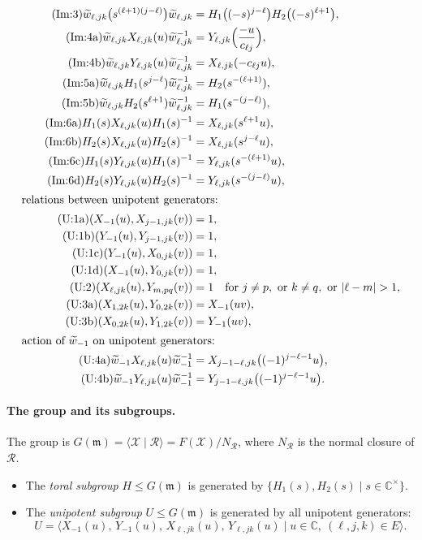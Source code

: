 \documentclass[11pt]{article}
\theoremstyle{definition}
\theoremstyle{remark}
\newcommand{\tw}{\widetilde{w}}
\newcommand{\Cx}{\mathbb{C}^{\times}}
\begin{document}
\begin{align*}
\tag{Im:3} \tw_{\ell,jk}\big(s^{(\ell+1)(j-\ell)}\big)\tw_{\ell,jk}&=H_1\big((-s)^{j-\ell}\big)H_2\big((-s)^{\ell+1}\big),\\
\tag{Im:4a} \tw_{\ell,jk}X_{\ell,jk}(u)\tw_{\ell,jk}^{-1}&=Y_{\ell,jk}\Big(\frac{-u}{c_{\ell j}}\Big),\\
\tag{Im:4b} \tw_{\ell,jk}Y_{\ell,jk}(u)\tw_{\ell,jk}^{-1}&=X_{\ell,jk}(-c_{\ell j}u),\\
\tag{Im:5a} \tw_{\ell,jk}H_1(s^{j-\ell})\tw_{\ell,jk}^{-1}&=H_2(s^{-(\ell+1)}),\\
\tag{Im:5b} \tw_{\ell,jk}H_2(s^{\ell+1})\tw_{\ell,jk}^{-1}&=H_1(s^{-(j-\ell)}),\\
\tag{Im:6a} H_1(s)X_{\ell,jk}(u)H_1(s)^{-1}&=X_{\ell,jk}(s^{\ell+1}u),\\
\tag{Im:6b} H_2(s)X_{\ell,jk}(u)H_2(s)^{-1}&=X_{\ell,jk}(s^{j-\ell}u),\\
\tag{Im:6c} H_1(s)Y_{\ell,jk}(u)H_1(s)^{-1}&=Y_{\ell,jk}(s^{-(\ell+1)}u),\\
\tag{Im:6d} H_2(s)Y_{\ell,jk}(u)H_2(s)^{-1}&=Y_{\ell,jk}(s^{-(j-\ell)}u),\\
\intertext{relations between unipotent generators:}
\tag{U:1a} (X_{-1}(u),X_{j-1,jk}(v))&=1,\\
\tag{U:1b} (Y_{-1}(u),Y_{j-1,jk}(v))&=1,\\
\tag{U:1c} (Y_{-1}(u),X_{0,jk}(v))&=1,\\
\tag{U:1d} (X_{-1}(u),Y_{0,jk}(v))&=1,\\
\tag{U:2} (X_{\ell,jk}(u),Y_{m,pq}(v))&=1\quad\text{for } j\neq p,\text{ or }k\neq q,\text{ or }|\ell-m|>1,\\
\tag{U:3a} (X_{1,2k}(u),Y_{0,2k}(v))&=X_{-1}(uv),\\
\tag{U:3b} (X_{0,2k}(u),Y_{1,2k}(v))&=Y_{-1}(uv),\\
\intertext{action of $\tw_{-1}$ on unipotent generators:}
\tag{U:4a} \tw_{-1}X_{\ell,jk}(u)\tw_{-1}^{-1}&=X_{j-1-\ell,jk}\big((-1)^{j-\ell-1}u\big),\\
\tag{U:4b} \tw_{-1}Y_{\ell,jk}(u)\tw_{-1}^{-1}&=Y_{j-1-\ell,jk}\big((-1)^{j-\ell-1}u\big).
\end{align*}

\paragraph{The group and its subgroups.} The group is $G(\mathfrak{m})=\langle\mathcal{X}\mid\mathcal{R}\rangle=F(\mathcal{X})/N_{\mathcal{R}}$, where $N_{\mathcal{R}}$ is the normal closure of $\mathcal{R}$.
\begin{itemize}
\item The \emph{toral subgroup} $H\le G(\mathfrak{m})$ is generated by $\{H_1(s),H_2(s)\mid s\in\Cx\}$.
\item The \emph{unipotent subgroup} $U\le G(\mathfrak{m})$ is generated by all unipotent generators:
\[
U=\langle X_{-1}(u),\,Y_{-1}(u),\,X_{\ell,jk}(u),\,Y_{\ell,jk}(u)\mid u\in\mathbb{C},\ (\ell,j,k)\in E\rangle.
\]
\end{itemize}
\end{document}
